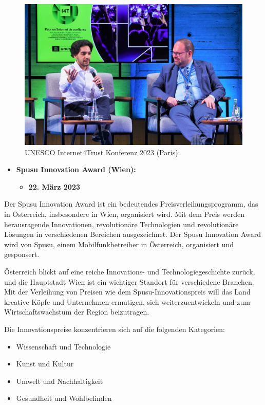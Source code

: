 \begin{figure}[H]
    \centering
    \includegraphics[width=1\textwidth]{pics/unesco-internet4trust-2023.jpg}
    \caption{UNESCO Internet4Trust Konferenz 2023 (Paris):}
    \label{fig:unesco-internet4trust-2023}
\end{figure}

\begin{itemize}
    \item \textbf{Spusu Innovation Award (Wien):}
          \begin{itemize}
              \item \textbf{22. März 2023}
          \end{itemize}
\end{itemize}

Der Spusu Innovation Award ist ein bedeutendes Preisverleihungsprogramm, das in Österreich, insbesondere in Wien, organisiert wird. Mit dem Preis werden herausragende Innovationen, revolutionäre Technologien und revolutionäre Lösungen in verschiedenen Bereichen ausgezeichnet. Der Spusu Innovation Award wird von Spusu, einem Mobilfunkbetreiber in Österreich, organisiert und gesponsert.

Österreich blickt auf eine reiche Innovations- und Technologiegeschichte zurück, und die Hauptstadt Wien ist ein wichtiger Standort für verschiedene Branchen. Mit der Verleihung von Preisen wie dem Spusu-Innovationspreis will das Land kreative Köpfe und Unternehmen ermutigen, sich weiterzuentwickeln und zum Wirtschaftswachstum der Region beizutragen.

Die Innovationspreise konzentrieren sich auf die folgenden Kategorien:

\begin{itemize}
    \item {Wissenschaft und Technologie}
    \item {Kunst und Kultur}
    \item {Umwelt und Nachhaltigkeit}
    \item {Gesundheit und Wohlbefinden}
\end{itemize}

